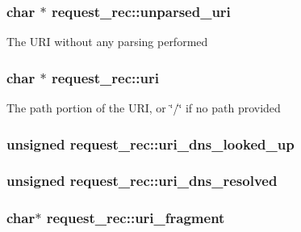 \subsubsection[{\texorpdfstring{unparsed\+\_\+uri}{unparsed_uri}}]{\setlength{\rightskip}{0pt plus 5cm}char $\ast$ request\+\_\+rec\+::unparsed\+\_\+uri}\hypertarget{structrequest__rec_a2c0077c30ea4446551ecee4e24ced868}{}\label{structrequest__rec_a2c0077c30ea4446551ecee4e24ced868}
The U\+RI without any parsing performed 
\subsubsection[{\texorpdfstring{uri}{uri}}]{\setlength{\rightskip}{0pt plus 5cm}char $\ast$ request\+\_\+rec\+::uri}\hypertarget{structrequest__rec_aee240e90eac55c732891e9408543990b}{}\label{structrequest__rec_aee240e90eac55c732891e9408543990b}
The path portion of the U\+RI, or \char`\"{}/\char`\"{} if no path provided 
\subsubsection[{\texorpdfstring{uri\+\_\+dns\+\_\+looked\+\_\+up}{uri_dns_looked_up}}]{\setlength{\rightskip}{0pt plus 5cm}unsigned request\+\_\+rec\+::uri\+\_\+dns\+\_\+looked\+\_\+up}\hypertarget{structrequest__rec_a75bcfa1cdcae084984d9168a8de2f5cf}{}\label{structrequest__rec_a75bcfa1cdcae084984d9168a8de2f5cf}
\subsubsection[{\texorpdfstring{uri\+\_\+dns\+\_\+resolved}{uri_dns_resolved}}]{\setlength{\rightskip}{0pt plus 5cm}unsigned request\+\_\+rec\+::uri\+\_\+dns\+\_\+resolved}\hypertarget{structrequest__rec_aac574ce1af15c729c23fdb80a826b946}{}\label{structrequest__rec_aac574ce1af15c729c23fdb80a826b946}
\subsubsection[{\texorpdfstring{uri\+\_\+fragment}{uri_fragment}}]{\setlength{\rightskip}{0pt plus 5cm}char$\ast$ request\+\_\+rec\+::uri\+\_\+fragment}\hypertarget{structrequest__rec_aadc46209b509d1b54a8e3a31b35dccfa}{}\label{structrequest__rec_aadc46209b509d1b54a8e3a31b35dccfa}
